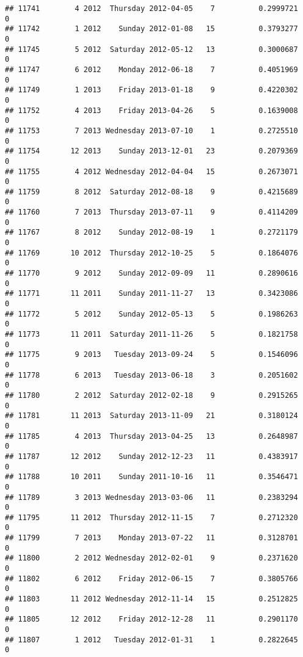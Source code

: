 \documentclass[
]{article}
\begin{document}
\begin{verbatim}
## 11741        4 2012  Thursday 2012-04-05    7          0.2999721             0
## 11742        1 2012    Sunday 2012-01-08   15          0.3793277             0
## 11745        5 2012  Saturday 2012-05-12   13          0.3000687             0
## 11747        6 2012    Monday 2012-06-18    7          0.4051969             0
## 11749        1 2013    Friday 2013-01-18    9          0.4220302             0
## 11752        4 2013    Friday 2013-04-26    5          0.1639008             0
## 11753        7 2013 Wednesday 2013-07-10    1          0.2725510             0
## 11754       12 2013    Sunday 2013-12-01   23          0.2079369             0
## 11755        4 2012 Wednesday 2012-04-04   15          0.2673071             0
## 11759        8 2012  Saturday 2012-08-18    9          0.4215689             0
## 11760        7 2013  Thursday 2013-07-11    9          0.4114209             0
## 11767        8 2012    Sunday 2012-08-19    1          0.2721179             0
## 11769       10 2012  Thursday 2012-10-25    5          0.1864076             0
## 11770        9 2012    Sunday 2012-09-09   11          0.2890616             0
## 11771       11 2011    Sunday 2011-11-27   13          0.3423086             0
## 11772        5 2012    Sunday 2012-05-13    5          0.1986263             0
## 11773       11 2011  Saturday 2011-11-26    5          0.1821758             0
## 11775        9 2013   Tuesday 2013-09-24    5          0.1546096             0
## 11778        6 2013   Tuesday 2013-06-18    3          0.2051602             0
## 11780        2 2012  Saturday 2012-02-18    9          0.2915265             0
## 11781       11 2013  Saturday 2013-11-09   21          0.3180124             0
## 11785        4 2013  Thursday 2013-04-25   13          0.2648987             0
## 11787       12 2012    Sunday 2012-12-23   11          0.4383917             0
## 11788       10 2011    Sunday 2011-10-16   11          0.3546471             0
## 11789        3 2013 Wednesday 2013-03-06   11          0.2383294             0
## 11795       11 2012  Thursday 2012-11-15    7          0.2712320             0
## 11799        7 2013    Monday 2013-07-22   11          0.3128701             0
## 11800        2 2012 Wednesday 2012-02-01    9          0.2371620             0
## 11802        6 2012    Friday 2012-06-15    7          0.3805766             0
## 11803       11 2012 Wednesday 2012-11-14   15          0.2512825             0
## 11805       12 2012    Friday 2012-12-28   11          0.2901170             0
## 11807        1 2012   Tuesday 2012-01-31    1          0.2822645             0

\end{verbatim}
\end{document}
